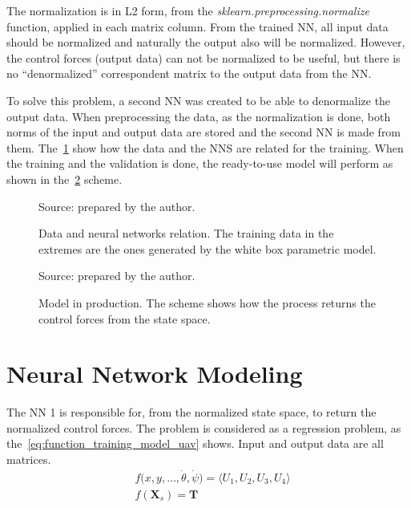 The normalization is in L2 form, from the \emph{sklearn.preprocessing.normalize} function, applied in each matrix column.
From the trained NN, all input data should be normalized and naturally the output also will be normalized.
However, the control forces (output data) can not be normalized to be useful, but there is no ``denormalized'' correspondent matrix to the output data from the NN.

To solve this problem, a second NN was created to be able to denormalize the output data.
When preprocessing the data, as the normalization is done, both norms of the input and output data are stored and the second NN is made from them.
The~\cref{fig:nns_scheme} show how the data and the NNS are related for the training. 
When the training and the validation is done, the ready-to-use model will perform as shown in the~\cref{fig:full_scheme} scheme.

\begin{figure}[!htb]
    \centering
    \caption[Data and neural networks relation]{Data and neural networks relation. The training data in the extremes are the ones generated by the white box parametric model.}
    

    {\footnotesize Source: prepared by the author.}
    \label{fig:nns_scheme}
\end{figure}

\begin{figure}[!htb]
    \centering
    \caption[Model in production]{Model in production. The scheme shows how the process returns the control forces from the state space.}
    

    {\footnotesize Source: prepared by the author.}
    \label{fig:full_scheme}
\end{figure}

\section{Neural Network Modeling}

The NN 1 is responsible for, from the normalized state space, to return the normalized control forces.
The problem is considered as a regression problem, as the~\cref{eq:function_training_model_uav} shows. Input and output data are all matrices.
%
\begin{subequations}\label{eq:function_training_model_uav}
    \begin{align}
        &f\big(x,y,\ldots,\dot{\theta},\dot{\psi}\big) = \langle U_1, U_2, U_3, U_4 \rangle \\
        &f(\mathbf{X}_s) = \mathbf{T}
    \end{align}
\end{subequations}

